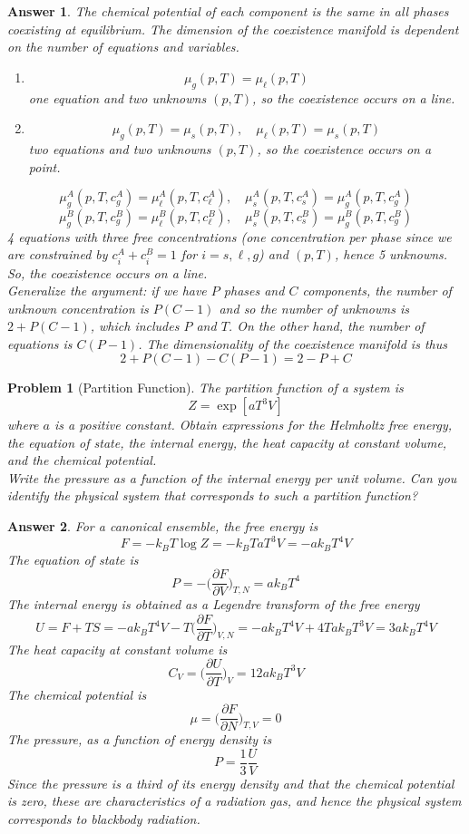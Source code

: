\documentclass[a4paper]{article}
\newtheorem{ans}{Answer}[section]
\theoremstyle{new}
\newtheorem{qns}{Problem}[section]
\begin{document}
\begin{ans}
The chemical potential of each component is the same in all phases coexisting at equilibrium. The dimension of the coexistence manifold is dependent on the number of equations and variables.
\begin{enumerate}[label=\roman*]
\item $$\mu_g(p,T)=\mu_\ell(p,T)$$
one equation and two unknowns $(p,T)$, so the coexistence occurs on a line.
\item $$\mu_g(p,T)=\mu_s(p,T),\quad\mu_\ell(p,T)=\mu_s(p,T)$$
two equations and two unknowns $(p,T)$, so the coexistence occurs on a point.
\end{enumerate}
$$\mu_g^A(p,T,c_g^A)=\mu_\ell^A(p,T,c_\ell^A),\quad\mu_s^A(p,T,c_s^A)=\mu_g^A(p,T,c_g^A)$$
$$\mu_g^B(p,T,c_g^B)=\mu_\ell^B(p,T,c_\ell^B),\quad\mu_s^B(p,T,c_s^B)=\mu_g^B(p,T,c_g^B)$$
4 equations with three free concentrations (one concentration per phase since we are constrained by $c_i^A+c_i^B=1$ for $i=s,\ell,g$) and $(p,T)$, hence 5 unknowns. So, the coexistence occurs on a line.\\[5pt]
Generalize the argument: if we have $P$ phases and $C$ components, the number of unknown concentration is $P(C-1)$ and so the number of unknowns is $2+P(C-1)$, which includes $P$ and $T$. On the other hand, the number of equations is $C(P-1)$. The dimensionality of the coexistence manifold is thus
$$2+P(C-1)-C(P-1)=2-P+C$$
\end{ans}
\newpage
\begin{qns}[Partition Function]
The partition function of a system is 
$$Z=\exp[aT^3V]$$
where $a$ is a positive constant. Obtain expressions for the Helmholtz free energy, the equation of state, the internal energy, the heat capacity at constant volume, and the chemical potential. \\[5pt]
Write the pressure as a function of the internal energy per unit volume. Can you identify the physical system that corresponds to such a partition function?
\end{qns}
\begin{ans}
For a canonical ensemble, the free energy is
$$F=-k_BT\log Z=-k_BTaT^3V=-ak_BT^4V$$
The equation of state is
$$P=-\bigg(\frac{\partial F}{\partial V}\bigg)_{T,N}=ak_BT^4$$
The internal energy is obtained as a Legendre transform of the free energy
$$U=F+TS=-ak_BT^4V-T\bigg(\frac{\partial F}{\partial T}\bigg)_{V,N}=-ak_BT^4V+4Tak_BT^3V=3ak_BT^4V$$
The heat capacity at constant volume is
$$C_V=\bigg(\frac{\partial U}{\partial T}\bigg)_V=12ak_BT^3V$$
The chemical potential is
$$\mu=\bigg(\frac{\partial F}{\partial N}\bigg)_{T,V}=0$$
The pressure, as a function of energy density is
$$P=\frac{1}{3}\frac{U}{V}$$
Since the pressure is a third of its energy density and that the chemical potential is zero, these are characteristics of a radiation gas, and hence the physical system corresponds to blackbody radiation.
\end{ans}
\end{document}
